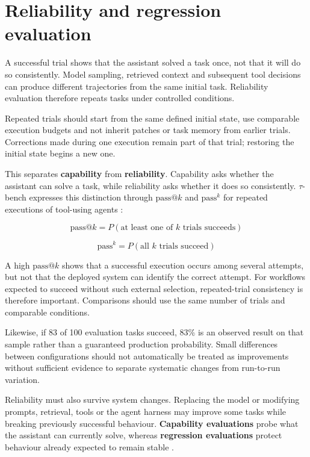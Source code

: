 \section{Reliability and regression evaluation}

A successful trial shows that the assistant solved a task once, not that it will do so consistently. Model sampling, retrieved context and subsequent tool decisions can produce different trajectories from the same initial task. Reliability evaluation therefore repeats tasks under controlled conditions.

Repeated trials should start from the same defined initial state, use comparable execution budgets and not inherit patches or task memory from earlier trials. Corrections made during one execution remain part of that trial; restoring the initial state begins a new one.

This separates \textbf{capability} from \textbf{reliability}. Capability asks whether the assistant can solve a task, while reliability asks whether it does so consistently. \(\tau\)-bench expresses this distinction through \(\mathrm{pass}@k\) and \(\mathrm{pass}^{k}\) for repeated executions of tool-using agents \parencite{yao2024taubench}:

\[
\mathrm{pass}@k = P(\text{at least one of } k \text{ trials succeeds})
\]

\[
\mathrm{pass}^{k} = P(\text{all } k \text{ trials succeed})
\]

A high \(\mathrm{pass}@k\) shows that a successful execution occurs among several attempts, but not that the deployed system can identify the correct attempt. For workflows expected to succeed without such external selection, repeated-trial consistency is therefore important. Comparisons should use the same number of trials and comparable conditions.

Likewise, if 83 of 100 evaluation tasks succeed, 83\% is an observed result on that sample rather than a guaranteed production probability. Small differences between configurations should not automatically be treated as improvements without sufficient evidence to separate systematic changes from run-to-run variation.

Reliability must also survive system changes. Replacing the model or modifying prompts, retrieval, tools or the agent harness may improve some tasks while breaking previously successful behaviour. \textbf{Capability evaluations} probe what the assistant can currently solve, whereas \textbf{regression evaluations} protect behaviour already expected to remain stable \parencite{grace2026evals}.

